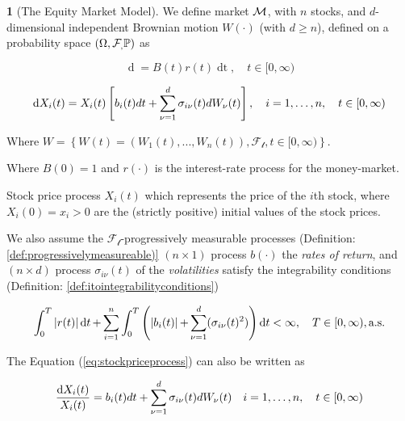 \documentclass[british]{amsart}
\numberwithin{equation}{section}
\numberwithin{figure}{section}
\theoremstyle{plain}
\theoremstyle{definition}
\newtheorem{defn}[thm]{\protect\definitionname}
\theoremstyle{plain}
\theoremstyle{plain}
\theoremstyle{plain}
\theoremstyle{remark}
\theoremstyle{plain}
\providecommand{\definitionname}{Definition}
\renewcommand{\d}[1]{\mathop{\mathrm{d}{#1}}}
\newcommand{\ranget}{t\in[0,\infty)}
\newcommand{\filtration}[1]{\mathcal{F_{#1}}}
\newcommand{\almostsurely}{\text{a.s.}}
\begin{document}
\begin{defn} [The Equity Market Model]
	\label{def:marketmodel}
 	\cite{fernholz2009} 
	We define market $\mathcal{M}$, with $n$ stocks, and $d$-dimensional independent Brownian 
	motion $W(\cdot)$ (with $d \ge n$), defined on a probability space 
	$\probabilityspace$ as

	\begin{equation*}
		\label{eq:equitymarketmodelriskfree}
		\d{B(t)} = B(t)r(t)\d{t},
		\quad \ranget
	\end{equation*}

	\begin{equation}
		\label{eq:stockpriceprocess}
		\d{X_{i}(t)} = X_{i}(t) 
				\left[
					b_{i}(t)dt + 
					\sum_{\nu=1}^{d} \sigma_{i\nu}(t) dW_{\nu}(t)
				\right],
				\quad \rangei,
				\quad \ranget
	\end{equation}

	Where $W = \left\{ W(t)=(W_{1}(t),...,W_{n}(t)),\filtration{t},\ranget \right\}$.

	Where $B(0)=1$ and $r(\cdot)$ is the interest-rate process for the money-market.

	Stock price process $X_{i}(t)$ which represents the price of the $i$th stock, where 
	$X_{i}(0) = x_{i} > 0$ are the (strictly positive) initial values of the stock prices.

	We also assume the $\filtration{t}$-progressively measurable processes (Definition: 
	\ref{def:progressivelymeasureable)} $(n \times 1)$ process $b(\cdot)$ the 
	\textit{rates of return}, and $(n \times d)$ process $\sigma_{i\nu}(t)$ of the 
	\textit{volatilities} satisfy the integrability conditions (Definition: 
	\ref{def:itointegrabilityconditions})

	\begin{equation*}
		\int_{0}^{T} 
		\abs{r(t)} 
		\d{t} +
		\sum_{i=1}^{n} \int_{0}^{T} 
			\left( 
					\abs{b_{i}(t)} +
					\sum_{\nu=1}^{d} ( \sigma_{i\nu}(t)^2  ) 
					\right) \d{t} < \infty,
		\quad
		T \in [0, \infty),
		\almostsurely
	 \end{equation*}

\end{defn}

The Equation (\ref{eq:stockpriceprocess}) can also be written as 

\begin{equation}
	\label{eq:stockpriceprocessdiff}
		\frac{\d{X_{i}(t)}}{X_{i}(t)} = 
				b_{i}(t)dt + 
				\sum_{\nu=1}^{d} \sigma_{i\nu}(t) dW_{\nu}(t)
			\quad \rangei,
			\quad \ranget
\end{equation}
\end{document}
